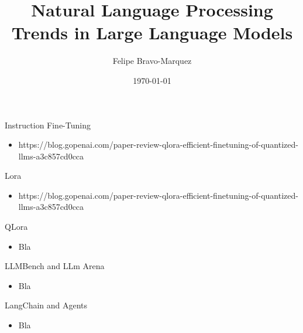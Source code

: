 \documentclass[handout]{beamer}
\title{Natural Language Processing \\ Trends in Large Language Models}
\author[Felipe Bravo Márquez]{\footnotesize
 \textcolor[rgb]{0.00,0.00,1.00}{Felipe Bravo-Marquez}}
\date{\today}
\begin{document}
\begin{frame}
\titlepage


\end{frame}


\begin{frame}{Instruction Fine-Tuning}
\begin{scriptsize}
\begin{itemize}
\item https://blog.gopenai.com/paper-review-qlora-efficient-finetuning-of-quantized-llms-a3c857cd0cca
\end{itemize}
\end{scriptsize}
\end{frame}



\begin{frame}{Lora}
\begin{scriptsize}
\begin{itemize}
\item https://blog.gopenai.com/paper-review-qlora-efficient-finetuning-of-quantized-llms-a3c857cd0cca
\end{itemize}
\end{scriptsize}
\end{frame}

\begin{frame}{QLora}
\begin{scriptsize}
\begin{itemize}
\item Bla
\end{itemize}
\end{scriptsize}
\end{frame}

\begin{frame}{LLMBench and LLm Arena}
\begin{scriptsize}
\begin{itemize}
\item Bla
\end{itemize}
\end{scriptsize}
\end{frame}


\begin{frame}{LangChain and Agents}
\begin{scriptsize}
\begin{itemize}
\item Bla
\end{itemize}
\end{scriptsize}
\end{frame}
\end{document}
